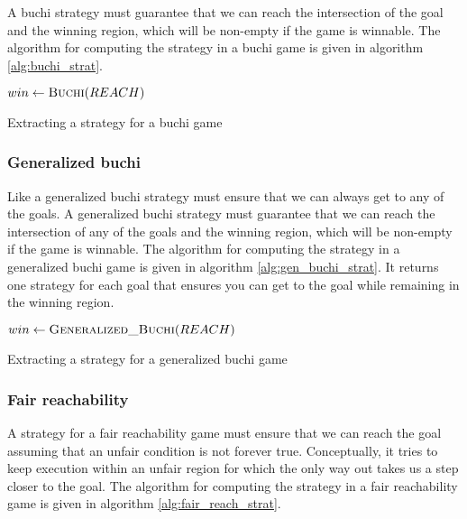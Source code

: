 \documentclass[a4paper,twoside,openright,11pt]{book}
\theoremstyle{definition}
\begin{document}
A buchi strategy must guarantee that we can reach the intersection of the goal and the winning region, which will be non-empty if the game is winnable. The algorithm for computing the strategy in a buchi game is given in algorithm \ref{alg:buchi_strat}.

\begin{algorithm}[t]
\begin{algorithmic}
\State $win \gets \Call{Buchi}{REACH}$
\State \Return {}
\EndFunction
\end{algorithmic}
\caption{Extracting a strategy for a buchi game}
\label{alg:buchi_strat}
\end{algorithm}

\subsubsection{Generalized buchi}

Like a generalized buchi strategy must ensure that we can always get to any of the goals. A generalized buchi strategy must guarantee that we can reach the intersection of any of the goals and the winning region, which will be non-empty if the game is winnable. The algorithm for computing the strategy in a generalized buchi game is given in algorithm \ref{alg:gen_buchi_strat}. It returns one strategy for each goal that ensures you can get to the goal while remaining in the winning region. 

\begin{algorithm}[t]
\begin{algorithmic}
\State $win \gets \Call{Generalized\_Buchi}{REACH}$

\State \Return {}
\EndFor

\EndFunction
\end{algorithmic}
\caption{Extracting a strategy for a generalized buchi game}
\label{alg:gen_buchi_strat}
\end{algorithm}

\subsubsection{Fair reachability}

A strategy for a fair reachability game must ensure that we can reach the goal assuming that an unfair condition is not forever true. Conceptually, it tries to keep execution within an unfair region for which the only way out takes us a step closer to the goal. The algorithm for computing the strategy in a fair reachability game is given in algorithm \ref{alg:fair_reach_strat}.
\end{document}
